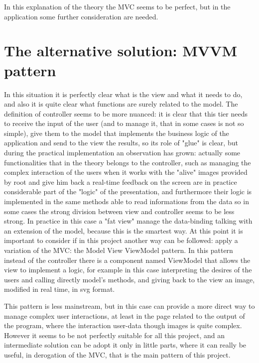 In this explanation of the theory the MVC seems to be perfect, but in the application some further consideration are needed.

\section{The alternative solution: MVVM pattern}

In this situation it is perfectly clear what is the view and what it needs to do, and also it is quite clear what functions are surely related to the model. The definition of controller seems to be more nuanced: it is clear that this tier needs to receive the input of the user (and to manage it, that in some cases is not so simple), give them to the model that implements the business logic of the application and send to the view the results, so its role of "glue" is clear, but during the practical implementation an observation has grown: actually some functionalities that in the theory belongs to the controller, such as managing the complex interaction of the users when it works with the "alive" images provided by root and give him back a real-time feedback on the screen are in practice considerable part of the "logic" of the presentation, and furthermore their logic is implemented in the same methods able to read informations from the data so in some cases the strong division between view and controller seems to be less strong. 
In practice in this case a "fat view" manage the data-binding talking with an extension of the model, because this is the smartest way. 
At this point it is important to consider if in this project another way can be followed: apply a variation of the MVC: the Model View ViewModel pattern. 
In this pattern instead of the controller there is a component named ViewModel that allows the view to implement a logic, for example in this case interpreting the desires of the users and calling directly model's methods, and giving back to the view an image, modified in real time, in svg format. 

This pattern is less mainstream, but in this case can provide a more direct way to manage complex user interactions, at least in the page related to the output of the program, where the interaction user-data though images is quite complex. 
However it seems to be not perfectly suitable for all this project, and an intermediate solution can be adopt it only in little parts, where it can really be useful, in derogation of the MVC, that is the main pattern of this project.


